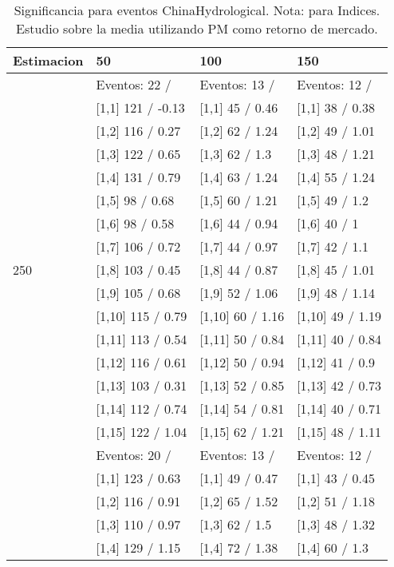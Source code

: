 \begin{table}

\caption{Significancia para eventos ChinaHydrological. Nota: para Indices. Estudio sobre la media utilizando PM como retorno de mercado.}
\centering
\begin{tabular}[t]{llll}
\toprule
Estimacion & 50 & 100 & 150\\
\midrule
 & Eventos:  22 / & Eventos:  13 / & Eventos:  12 /\\
 & {}[1,1] 121  / -0.13 & {}[1,1] 45  / 0.46 & {}[1,1] 38  / 0.38\\
 & {}[1,2] 116  / 0.27 & {}[1,2] 62  / 1.24 & {}[1,2] 49  / 1.01\\
 & {}[1,3] 122  / 0.65 & {}[1,3] 62  / 1.3 & {}[1,3] 48  / 1.21\\
 & {}[1,4] 131  / 0.79 & {}[1,4] 63  / 1.24 & {}[1,4] 55  / 1.24\\
\addlinespace
 & {}[1,5] 98  / 0.68 & {}[1,5] 60  / 1.21 & {}[1,5] 49  / 1.2\\
 & {}[1,6] 98  / 0.58 & {}[1,6] 44  / 0.94 & {}[1,6] 40  / 1\\
 & {}[1,7] 106  / 0.72 & {}[1,7] 44  / 0.97 & {}[1,7] 42  / 1.1\\
250 & {}[1,8] 103  / 0.45 & {}[1,8] 44  / 0.87 & {}[1,8] 45  / 1.01\\
 & {}[1,9] 105  / 0.68 & {}[1,9] 52  / 1.06 & {}[1,9] 48  / 1.14\\
\addlinespace
 & {}[1,10] 115  / 0.79 & {}[1,10] 60  / 1.16 & {}[1,10] 49  / 1.19\\
 & {}[1,11] 113  / 0.54 & {}[1,11] 50  / 0.84 & {}[1,11] 40  / 0.84\\
 & {}[1,12] 116  / 0.61 & {}[1,12] 50  / 0.94 & {}[1,12] 41  / 0.9\\
 & {}[1,13] 103  / 0.31 & {}[1,13] 52  / 0.85 & {}[1,13] 42  / 0.73\\
 & {}[1,14] 112  / 0.74 & {}[1,14] 54  / 0.81 & {}[1,14] 40  / 0.71\\
\addlinespace
 & {}[1,15] 122  / 1.04 & {}[1,15] 62  / 1.21 & {}[1,15] 48  / 1.11\\
 & Eventos:  20 / & Eventos:  13 / & Eventos:  12 /\\
 & {}[1,1] 123  / 0.63 & {}[1,1] 49  / 0.47 & {}[1,1] 43  / 0.45\\
 & {}[1,2] 116  / 0.91 & {}[1,2] 65  / 1.52 & {}[1,2] 51  / 1.18\\
 & {}[1,3] 110  / 0.97 & {}[1,3] 62  / 1.5 & {}[1,3] 48  / 1.32\\
\addlinespace
 & {}[1,4] 129  / 1.15 & {}[1,4] 72  / 1.38 & {}[1,4] 60  / 1.3\\

\end{tabular}
\end{table}
